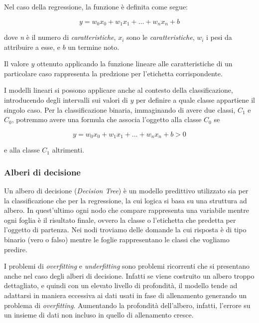 \documentclass[a4paper,12pt]{report}
\begin{document}
Nel caso della regressione, la funzione è definita come segue: 

\begin{equation*}
    y  = w_0x_0 + w_1x_1 + \dots + w_nx_n + b
\end{equation*}

\noindent dove \textit{n} è il numero di \textit{caratteristiche}, $x_i$ sono le \textit{caratteristiche}, $w_i$ i pesi da attribuire a esse, e $b$ un termine noto.

Il valore $y$ ottenuto applicando la funzione lineare alle caratteristiche di un particolare caso rappresenta la predzione per l'etichetta corrispondente.

\bigskip

I modelli lineari si possono applicare anche al contesto della classificazione, introducendo degli intervalli sui valori di $y$ per definire a quale classe appartiene il singolo caso. 
Per la classificazione binaria, immaginando di avere due classi, $C_1$ e $C_0$, potremmo avere una formula che associa l'oggetto alla classe $C_0$ se

\begin{equation*}
    y = w_0x_0 + w_1x_1 + \dots + w_nx_n + b > 0
\end{equation*}

\noindent e alla classe $C_1$ altrimenti.


\subsubsection{Alberi di decisione}

Un albero di decisione (\textit{Decision Tree}) è un modello predittivo utilizzato sia per la classificazione che per la regressione, la cui logica si basa su una struttura ad albero. In quest'ultimo ogni nodo che compare rappresenta una variabile mentre ogni foglia è il risultato finale, ovvero la classe o l'etichetta che predetta per l'oggetto di partenza.
Nei nodi troviamo delle domande la cui risposta è di tipo binario (vero o falso) mentre le foglie rappresentano le classi che vogliamo predire.

I problemi di \textit{overfitting} e \textit{underfitting} sono problemi ricorrenti che si presentano anche nel caso degli alberi di decisione. Infatti se viene costruito un albero troppo dettagliato, e quindi con un elevato livello di profondità, il modello tende ad adattarsi in maniera eccessiva ai dati usati in fase di allenamento generando un problema di \textit{overfitting}.
Aumentando la profondità dell'albero, infatti, l'errore su un insieme di dati non incluso in quello di allenamento cresce.
\end{document}
